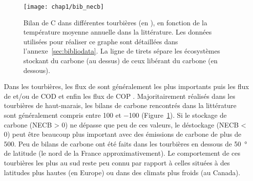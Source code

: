 \begin{figure}
\centering
\texttt{[image: chap1/bib\_necb]}
\caption{Bilan de C dans différentes tourbières (en \si{\gcma}), en fonction de la température moyenne annuelle dans la littérature. Les données utilisées pour réaliser ce graphe sont détaillées dans l'annexe~\ref{sec:bibliodata}. La ligne de tirets sépare les écosystèmes stockant du carbone (au dessus) de ceux libérant du carbone (en dessous).}
\label{fig:bib_necb}
\end{figure}


Dans les tourbières, les flux de \coo sont généralement les plus importants puis les flux de \chh et/ou de COD et enfin les flux de COP \citep{worrall2009,koehler2011}.
Majoritairement réalisés dans les tourbières de haut-marais, les bilans de carbone rencontrés dans la littérature sont généralement compris entre 100 et \SI{-100}{\gcma} (Figure~\ref{fig:bib_necb}).
Si le stockage de carbone (NECB > 0) ne dépasse que peu de ces valeurs, le déstockage (NECB < 0) peut être beaucoup plus important avec des émissions de carbone de plus de \SI{500}{\gcma}.
Peu de bilans de carbone ont été faits dans les tourbières en dessous de \SI{50}{\degree} de latitude (le nord de la France approximativement).
Le comportement de ces tourbières les plus au sud reste peu connu par rapport à celles situées à des latitudes plus hautes (en Europe) ou dans des climats plus froids (au Canada).

